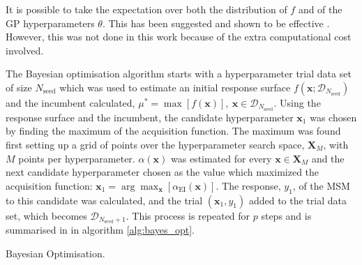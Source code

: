 It is possible to take the expectation over both the distribution of $f$ and of the GP hyperparameters $\theta$. This has been suggested and shown to be effective \cite{NIPS2012_4522}. However, this was not done in this work because of the extra computational cost involved. 

The Bayesian optimisation algorithm \cite{shahriariTakingHumanOut2016} starts with a hyperparameter trial data set of size $N_{\mathrm{seed}}$ which was used to estimate an initial response surface $f(\mathbf{x}; \mathcal{D}_{N_{\mathrm{seed}}})$ and the incumbent calculated, $\mu^{*} = \max{\left[f(\mathbf{x})\right]},\ \mathbf{x}\in \mathcal{D}_{N_{\mathrm{seed}}}$. Using the response surface and the incumbent, the  candidate hyperparameter $\mathbf{x}_{1}$ was chosen by finding the maximum of the acquisition function. The maximum was found first setting up a grid of points over the hyperparameter search space, $\mathbf{X}_{M}$, with $M$ points per hyperparameter.  $\alpha(\mathbf{x})$ was estimated for every $\mathbf{x}\in \mathbf{X}_{M}$ and the next candidate hyperparameter chosen as the value which maximized the acquisition function: $\mathbf{x}_{1} = \arg\max_{\mathbf{x}}\left[ \alpha_{\mathrm{EI}}(\mathbf{x})\right]$. The response, $y_{1}$, of the MSM to this candidate was calculated, and the trial $(\mathbf{x}_{1}, y_{1})$ added to the trial data set, which becomes  $\mathcal{D}_{N_{\mathrm{seed}}+1}$. This process is repeated for $p$ steps and is summarised in in algorithm \ref{alg:bayes_opt}.

\begin{algorithm}
\BlankLine
{}
\caption{Bayesian Optimisation.\label{alg:bayes_opt}}
\end{algorithm}

